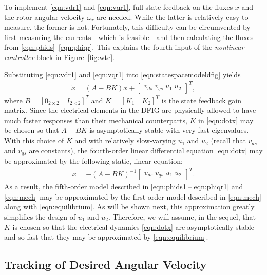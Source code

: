\documentclass[journal]{IEEEtran}
\begin{document}
To implement \eqref{eqn:vdr1} and \eqref{eqn:vqr1}, full state feedback on the fluxes $x$ and the rotor angular velocity $\omega_r$ are needed. While the latter is relatively easy to measure, the former is not. Fortunately, this difficulty can be circumvented by first measuring the currents---which is feasible---and then calculating the fluxes from \eqref{eqn:phids}--\eqref{eqn:phiqr}. This explains the fourth input of the {\it nonlinear controller} block in Figure~\ref{fig:wtc}.

Substituting \eqref{eqn:vdr1} and \eqref{eqn:vqr1} into \eqref{eqn:statespacemodeldfig} yields
\begin{align}
\dot{x}=(A-BK)x+\begin{bmatrix}
v_{ds}\;v_{qs}\;u_1\;u_2
\end{bmatrix}^T, \label{eqn:dotx}
\end{align}
where $B=[0_{2\times 2}\quad I_{2\times 2}]^T$ and $K=[K_1\quad K_2]^T$ is the state feedback gain matrix.
Since the electrical elements in the DFIG are physically allowed to have much faster responses than their mechanical counterparts, $K$ in \eqref{eqn:dotx} may be chosen so that $A-BK$ is asymptotically stable with very fast eigenvalues. With this choice of $K$ and with relatively slow-varying $u_1$ and $u_2$ (recall that $v_{ds}$ and $v_{qs}$ are constants), the fourth-order linear differential equation \eqref{eqn:dotx} may be approximated by the following static, linear equation:
\begin{align}
x=-(A-BK)^{-1}
\begin{bmatrix}
v_{ds}\;v_{qs}\;u_1\;u_2
\end{bmatrix}^T.\label{eqn:equilibrium}
\end{align}
As a result, the fifth-order model described in \eqref{eqn:phids1}--\eqref{eqn:phiqr1} and \eqref{eqn:mech} may be approximated by the first-order model described in \eqref{eqn:mech} along with \eqref{eqn:equilibrium}. As will be shown next, this approximation greatly simplifies the design of $u_1$ and $u_2$. Therefore, we will assume, in the sequel, that $K$ is chosen so that the electrical dynamics \eqref{eqn:dotx} are asymptotically stable and so fast that they may be approximated by \eqref{eqn:equilibrium}.

\subsection{Tracking of Desired Angular Velocity}\label{sec:asymtracdesangvel}
\end{document}
